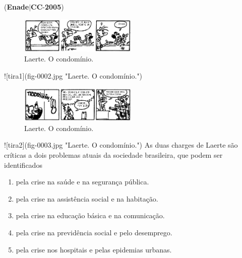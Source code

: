 \documentclass{exam}
\begin{document}
\begin{questions}
\question (\textbf{Enade}$|$\textbf{CC}-\textbf{2005}) \begin{figure}[H]
	\begin{center}
		\includegraphics[width=0.5\textwidth]{CIENCIA_DA_COMPUTACAO_Prova2005-utf8_figuras/fig-0002.jpg}
		\caption{Laerte. O condomínio.}
	\end{center}
\end{figure}
![tira1](fig-0002.jpg "Laerte. O condomínio.")
\begin{figure}[H]
	\begin{center}
		\includegraphics[width=0.5\textwidth]{CIENCIA_DA_COMPUTACAO_Prova2005-utf8_figuras/fig-0003.jpg}
		\caption{Laerte. O condomínio.}
	\end{center}
\end{figure}
![tira2](fig-0003.jpg "Laerte. O condomínio.")
As duas charges de Laerte são críticas a dois problemas atuais da sociedade brasileira, que podem ser identificados
	\begin{enumerate}[label=\alph*)]
		\item  pela crise na saúde e na segurança pública.
		\item  pela crise na assistência social e na habitação.
		\item  pela crise na educação básica e na comunicação.
		\item  pela crise na previdência social e pelo desemprego.
		\item  pela crise nos hospitais e pelas epidemias urbanas.

	\end{enumerate}


\end{questions}
\end{document}
